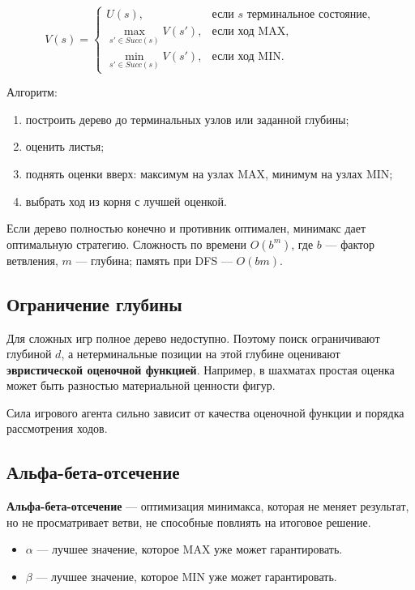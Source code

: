 \[
V(s)=
\begin{cases}
U(s), & \text{если } s \text{ терминальное состояние},\\
\max\limits_{s'\in Succ(s)} V(s'), & \text{если ход MAX},\\
\min\limits_{s'\in Succ(s)} V(s'), & \text{если ход MIN}.
\end{cases}
\]

Алгоритм:
\begin{enumerate}
    \item построить дерево до терминальных узлов или заданной глубины;
    \item оценить листья;
    \item поднять оценки вверх: максимум на узлах MAX, минимум на узлах MIN;
    \item выбрать ход из корня с лучшей оценкой.
\end{enumerate}

Если дерево полностью конечно и противник оптимален, минимакс дает оптимальную стратегию. Сложность по времени $O(b^m)$, где $b$ --- фактор ветвления, $m$ --- глубина; память при DFS --- $O(bm)$.

\subsection*{Ограничение глубины}

Для сложных игр полное дерево недоступно. Поэтому поиск ограничивают глубиной $d$, а нетерминальные позиции на этой глубине оценивают \textbf{эвристической оценочной функцией}. Например, в шахматах простая оценка может быть разностью материальной ценности фигур.

Сила игрового агента сильно зависит от качества оценочной функции и порядка рассмотрения ходов.

\subsection*{Альфа-бета-отсечение}

\textbf{Альфа-бета-отсечение} --- оптимизация минимакса, которая не меняет результат, но не просматривает ветви, не способные повлиять на итоговое решение.

\begin{itemize}
    \item $\alpha$ --- лучшее значение, которое MAX уже может гарантировать.
    \item $\beta$ --- лучшее значение, которое MIN уже может гарантировать.
\end{itemize}

